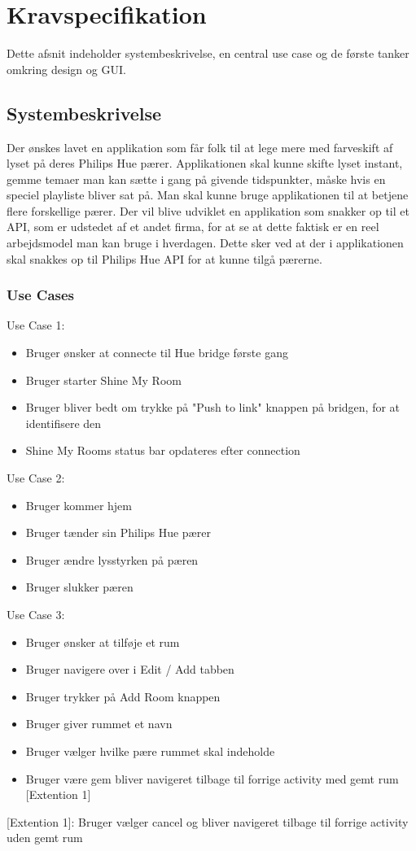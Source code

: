 	\chapter{Kravspecifikation}
	Dette afsnit indeholder systembeskrivelse, en central use case og de første tanker omkring design og GUI. \\
	
		\section{Systembeskrivelse}
		Der ønskes lavet en applikation som får folk til at lege mere med farveskift af lyset på deres Philips Hue pærer.
		Applikationen skal kunne skifte lyset instant, gemme temaer man kan sætte i gang på givende tidspunkter, måske hvis en speciel playliste bliver sat på. Man skal kunne bruge applikationen til at betjene flere forskellige pærer.
		Der vil blive udviklet en applikation som snakker op til et API, som er udstedet af et andet firma, for at se at dette faktisk er en reel arbejdsmodel man kan bruge i hverdagen.
		Dette sker ved at der i applikationen skal snakkes op til Philips Hue API for at kunne tilgå pærerne.
			
		\subsection{Use Cases}
		Use Case 1:
		\begin{itemize}
			\item Bruger ønsker at connecte til Hue bridge første gang
			\item Bruger starter Shine My Room
			\item Bruger bliver bedt om trykke på "Push to link" knappen på bridgen, for at identifisere den
			\item Shine My Rooms status bar opdateres efter connection
		\end{itemize}
		
		Use Case 2:
		\begin{itemize}
			\item Bruger kommer hjem
			\item Bruger tænder sin Philips Hue pærer
			\item Bruger ændre lysstyrken på pæren
			\item Bruger slukker pæren
		\end{itemize}
	
		Use Case 3:
		\begin{itemize}
			\item Bruger ønsker at tilføje et rum
			\item Bruger navigere over i Edit / Add tabben
			\item Bruger trykker på Add Room knappen
			\item Bruger giver rummet et navn
			\item Bruger vælger hvilke pære rummet skal indeholde
			\item Bruger være gem bliver navigeret tilbage til forrige activity med gemt rum [Extention 1]
		\end{itemize}
		[Extention 1]: Bruger vælger cancel og bliver navigeret tilbage til forrige activity uden gemt rum
		\newpage
		
